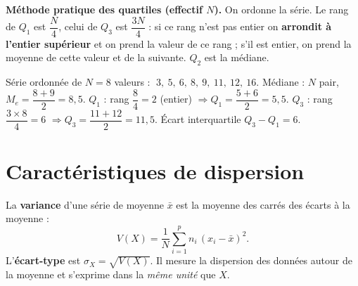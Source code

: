\begin{aretenir}
\textbf{Méthode pratique des quartiles (effectif $N$).} On ordonne la série.
Le rang de $Q_1$ est $\dfrac N4$, celui de $Q_3$ est $\dfrac{3N}4$ : si ce rang
n'est pas entier on \textbf{arrondit à l'entier supérieur} et on prend la valeur
de ce rang ; s'il est entier, on prend la moyenne de cette valeur et de la suivante.
$Q_2$ est la médiane.
\end{aretenir}

\begin{illus}
\end{illus}

\begin{exemple}
Série ordonnée de $N=8$ valeurs : $\;3,\ 5,\ 6,\ 8,\ 9,\ 11,\ 12,\ 16$.
Médiane : $N$ pair, $M_e=\dfrac{8+9}{2}=8{,}5$.
$Q_1$ : rang $\dfrac84=2$ (entier) $\Rightarrow Q_1=\dfrac{5+6}{2}=5{,}5$.
$Q_3$ : rang $\dfrac{3\times8}4=6$ $\Rightarrow Q_3=\dfrac{11+12}{2}=11{,}5$.
Écart interquartile $Q_3-Q_1=6$.
\end{exemple}

\section{Caractéristiques de dispersion}

\begin{definition}
La \textbf{variance} d'une série de moyenne $\bar x$ est la moyenne des carrés des
écarts à la moyenne :
\[
V(X)=\frac1N\sum_{i=1}^{p}n_i\,(x_i-\bar x)^2 .
\]
L'\textbf{écart-type} est $\sigma_X=\sqrt{V(X)}$. Il mesure la dispersion des
données autour de la moyenne et s'exprime dans la \emph{même unité} que $X$.
\end{definition}

